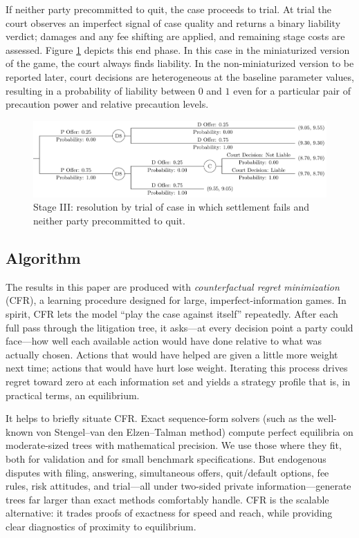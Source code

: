 \documentclass{article}
\begin{document}
If neither party precommitted to quit, the case proceeds to trial. At trial the court observes an imperfect signal of case quality and returns a binary liability verdict; damages and any fee shifting are applied, and remaining stage costs are assessed. Figure \ref{fig:smalltree_end_adjudication} depicts this end phase. In this case in the miniaturized version of the game, the court always finds liability. In the non-miniaturized version to be reported later, court decisions are heterogeneous at the baseline parameter values, resulting in a probability of liability between $0$ and $1$ even for a particular pair of precaution power and relative precaution levels. 

  \begin{figure}[t]
    \centering
    \includegraphics[width=\textwidth]{../Figures/smalltree_end_adjudication.pdf}
    \caption{Stage III: resolution by trial of case in which settlement fails and neither party precommitted to quit.}
    \label{fig:smalltree_end_adjudication}
  \end{figure}

\subsection{Algorithm}

The results in this paper are produced with \emph{counterfactual regret minimization} (CFR), a learning procedure designed for large, imperfect-information games. In spirit, CFR lets the model “play the case against itself” repeatedly. After each full pass through the litigation tree, it asks—at every decision point a party could face—how well each available action would have done relative to what was actually chosen. Actions that would have helped are given a little more weight next time; actions that would have hurt lose weight. Iterating this process drives regret toward zero at each information set and yields a strategy profile that is, in practical terms, an equilibrium.

It helps to briefly situate CFR. Exact sequence-form solvers (such as the well-known von Stengel–van den Elzen–Talman method) compute perfect equilibria on moderate-sized trees with mathematical precision. We use those where they fit, both for validation and for small benchmark specifications. But endogenous disputes with filing, answering, simultaneous offers, quit/default options, fee rules, risk attitudes, and trial—all under two-sided private information—generate trees far larger than exact methods comfortably handle. CFR is the scalable alternative: it trades proofs of exactness for speed and reach, while providing clear diagnostics of proximity to equilibrium.
\end{document}

